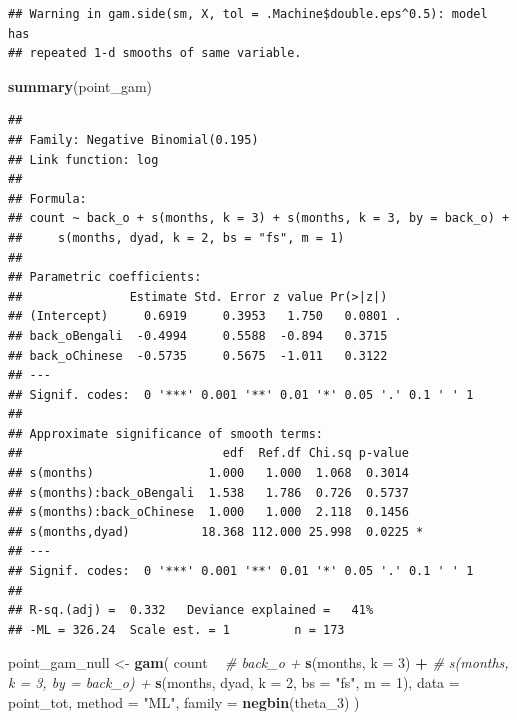 \documentclass[]{article}
\newenvironment{Shaded}{\begin{snugshade}}{\end{snugshade}}
\newcommand{\CommentTok}[1]{\textcolor[rgb]{0.56,0.35,0.01}{\textit{#1}}}
\newcommand{\DataTypeTok}[1]{\textcolor[rgb]{0.13,0.29,0.53}{#1}}
\newcommand{\DecValTok}[1]{\textcolor[rgb]{0.00,0.00,0.81}{#1}}
\newcommand{\KeywordTok}[1]{\textcolor[rgb]{0.13,0.29,0.53}{\textbf{#1}}}
\newcommand{\NormalTok}[1]{#1}
\newcommand{\OperatorTok}[1]{\textcolor[rgb]{0.81,0.36,0.00}{\textbf{#1}}}
\newcommand{\StringTok}[1]{\textcolor[rgb]{0.31,0.60,0.02}{#1}}
\begin{document}
\begin{verbatim}
## Warning in gam.side(sm, X, tol = .Machine$double.eps^0.5): model has
## repeated 1-d smooths of same variable.
\end{verbatim}

\begin{Shaded}
\begin{Highlighting}[]
\KeywordTok{summary}\NormalTok{(point_gam)}
\end{Highlighting}
\end{Shaded}

\begin{verbatim}
## 
## Family: Negative Binomial(0.195) 
## Link function: log 
## 
## Formula:
## count ~ back_o + s(months, k = 3) + s(months, k = 3, by = back_o) + 
##     s(months, dyad, k = 2, bs = "fs", m = 1)
## 
## Parametric coefficients:
##               Estimate Std. Error z value Pr(>|z|)  
## (Intercept)     0.6919     0.3953   1.750   0.0801 .
## back_oBengali  -0.4994     0.5588  -0.894   0.3715  
## back_oChinese  -0.5735     0.5675  -1.011   0.3122  
## ---
## Signif. codes:  0 '***' 0.001 '**' 0.01 '*' 0.05 '.' 0.1 ' ' 1
## 
## Approximate significance of smooth terms:
##                            edf  Ref.df Chi.sq p-value  
## s(months)                1.000   1.000  1.068  0.3014  
## s(months):back_oBengali  1.538   1.786  0.726  0.5737  
## s(months):back_oChinese  1.000   1.000  2.118  0.1456  
## s(months,dyad)          18.368 112.000 25.998  0.0225 *
## ---
## Signif. codes:  0 '***' 0.001 '**' 0.01 '*' 0.05 '.' 0.1 ' ' 1
## 
## R-sq.(adj) =  0.332   Deviance explained =   41%
## -ML = 326.24  Scale est. = 1         n = 173
\end{verbatim}

\begin{Shaded}
\begin{Highlighting}[]
\NormalTok{point_gam_null <-}\StringTok{ }\KeywordTok{gam}\NormalTok{(}
\NormalTok{  count }\OperatorTok{~}
\StringTok{    }\CommentTok{# back_o +}
\StringTok{    }\KeywordTok{s}\NormalTok{(months, }\DataTypeTok{k =} \DecValTok{3}\NormalTok{) }\OperatorTok{+}
\StringTok{    }\CommentTok{# s(months, k = 3, by = back_o) +}
\StringTok{    }\KeywordTok{s}\NormalTok{(months, dyad, }\DataTypeTok{k =} \DecValTok{2}\NormalTok{, }\DataTypeTok{bs =} \StringTok{"fs"}\NormalTok{, }\DataTypeTok{m =} \DecValTok{1}\NormalTok{),}
  \DataTypeTok{data =}\NormalTok{ point_tot,}
  \DataTypeTok{method =} \StringTok{"ML"}\NormalTok{,}
  \DataTypeTok{family =} \KeywordTok{negbin}\NormalTok{(theta_}\DecValTok{3}\NormalTok{)}
\NormalTok{)}
\end{Highlighting}
\end{Shaded}
\end{document}
